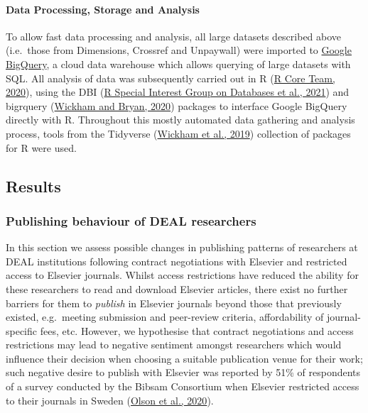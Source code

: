 \documentclass[
]{article}
\begin{document}
\hypertarget{data-processing-storage-and-analysis}{%
\paragraph{Data Processing, Storage and Analysis}\label{data-processing-storage-and-analysis}}

To allow fast data processing and analysis, all large datasets described above (i.e.~those from Dimensions, Crossref and Unpaywall) were imported to \href{https://cloud.google.com/bigquery}{Google BigQuery}, a cloud data warehouse which allows querying of large datasets with SQL. All analysis of data was subsequently carried out in R (\href{http://www.R-project.org/}{R Core Team, 2020}), using the DBI (\href{https://CRAN.R-project.org/package=DBI}{R Special Interest Group on Databases et al., 2021}) and bigrquery (\href{https://CRAN.R-project.org/package=bigrquery}{Wickham and Bryan, 2020}) packages to interface Google BigQuery directly with R. Throughout this mostly automated data gathering and analysis process, tools from the Tidyverse (\href{https://doi.org/10.21105/joss.01686}{Wickham et al., 2019}) collection of packages for R were used.

\hypertarget{results}{%
\subsection{Results}\label{results}}

\hypertarget{publishing-behaviour-of-deal-researchers}{%
\subsubsection{Publishing behaviour of DEAL researchers}\label{publishing-behaviour-of-deal-researchers}}

In this section we assess possible changes in publishing patterns of researchers at DEAL institutions following contract negotiations with Elsevier and restricted access to Elsevier journals. Whilst access restrictions have reduced the ability for these researchers to read and download Elsevier articles, there exist no further barriers for them to \emph{publish} in Elsevier journals beyond those that previously existed, e.g.~meeting submission and peer-review criteria, affordability of journal-specific fees, etc. However, we hypothesise that contract negotiations and access restrictions may lead to negative sentiment amongst researchers which would influence their decision when choosing a suitable publication venue for their work; such negative desire to publish with Elsevier was reported by 51\% of respondents of a survey conducted by the Bibsam Consortium when Elsevier restricted access to their journals in Sweden (\href{http://doi.org/10.1629/uksg.507}{Olson et al., 2020}).
\end{document}
